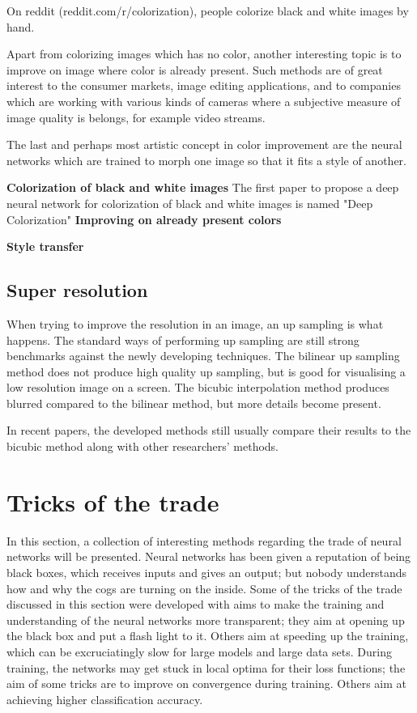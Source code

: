 On reddit (reddit.com/r/colorization), people colorize black and white images by hand.

Apart from colorizing images which has no color, another interesting topic is to improve on image where color is already present. Such methods are of great interest to the consumer markets, image editing applications, and to companies which are working with various kinds of cameras where a subjective measure of image quality is belongs, for example video streams. 

The last and perhaps most artistic concept in color improvement are the neural networks which are trained to morph one image so that it fits a style of another. 


\textbf{Colorization of black and white images}
The first paper to propose a deep neural network for colorization of black and white images is named "Deep Colorization" %
\textbf{Improving on already present colors}

\textbf{Style transfer}

\subsection{Super resolution}
When trying to improve the resolution in an image, an up sampling is what happens. The standard ways of performing up sampling are still strong benchmarks against the newly developing techniques. The bilinear up sampling method does not produce high quality up sampling, but is good for visualising a low resolution image on a screen. The bicubic interpolation method produces blurred compared to the bilinear method, but more details become present. 

In recent papers, the developed methods still usually compare their results to the bicubic method along with other researchers' methods.

\section{Tricks of the trade}
In this section, a collection of interesting methods regarding the trade of neural networks will be presented. Neural networks has been given a reputation of being black boxes, which receives inputs and gives an output; but nobody understands how and why the cogs are turning on the inside. Some of the tricks of the trade discussed in this section were developed with aims to make the training and understanding of the neural networks more transparent; they aim at opening up the black box and put a flash light to it. Others aim at speeding up the training, which can be excruciatingly slow for large models and large data sets. During training, the networks may get stuck in local optima for their loss functions; the aim of some tricks are to improve on convergence during training. Others aim at achieving higher classification accuracy. 


